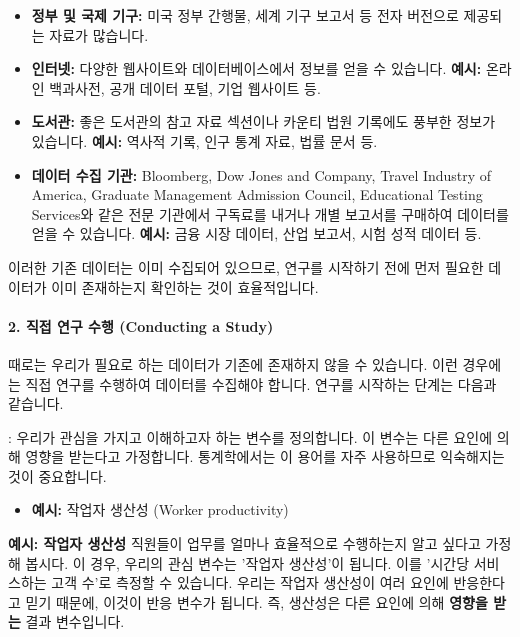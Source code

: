 \documentclass[11pt,a4paper]{article}
\begin{document}
\begin{itemize}
    \item \textbf{정부 및 국제 기구:} 미국 정부 간행물, 세계 기구 보고서 등 전자 버전으로 제공되는 자료가 많습니다.
    \item \textbf{인터넷:} 다양한 웹사이트와 데이터베이스에서 정보를 얻을 수 있습니다.
    \textbf{예시:} 온라인 백과사전, 공개 데이터 포털, 기업 웹사이트 등.
    \item \textbf{도서관:} 좋은 도서관의 참고 자료 섹션이나 카운티 법원 기록에도 풍부한 정보가 있습니다.
    \textbf{예시:} 역사적 기록, 인구 통계 자료, 법률 문서 등.
    \item \textbf{데이터 수집 기관:} Bloomberg, Dow Jones and Company, Travel Industry of America, Graduate Management Admission Council, Educational Testing Services와 같은 전문 기관에서 구독료를 내거나 개별 보고서를 구매하여 데이터를 얻을 수 있습니다.
    \textbf{예시:} 금융 시장 데이터, 산업 보고서, 시험 성적 데이터 등.
\end{itemize}
이러한 기존 데이터는 이미 수집되어 있으므로, 연구를 시작하기 전에 먼저 필요한 데이터가 이미 존재하는지 확인하는 것이 효율적입니다.

\paragraph{2. 직접 연구 수행 (Conducting a Study)}
때로는 우리가 필요로 하는 데이터가 기존에 존재하지 않을 수 있습니다. 이런 경우에는 직접 연구를 수행하여 데이터를 수집해야 합니다. 연구를 시작하는 단계는 다음과 같습니다.

\begin{tcolorbox}[mybox, title={연구 시작의 첫 번째 단계: 반응 변수 정의 (Step One in Initiating a Study)}]
: 우리가 관심을 가지고 이해하고자 하는 변수를 정의합니다. 이 변수는 다른 요인에 의해 영향을 받는다고 가정합니다. 통계학에서는 이 용어를 자주 사용하므로 익숙해지는 것이 중요합니다.
\begin{itemize}
    \item \textbf{예시:} 작업자 생산성 (Worker productivity)
\end{itemize}
\end{tcolorbox}

\begin{examplebox}
\textbf{예시: 작업자 생산성}
직원들이 업무를 얼마나 효율적으로 수행하는지 알고 싶다고 가정해 봅시다. 이 경우, 우리의 관심 변수는 '작업자 생산성'이 됩니다. 이를 '시간당 서비스하는 고객 수'로 측정할 수 있습니다. 우리는 작업자 생산성이 여러 요인에 반응한다고 믿기 때문에, 이것이 반응 변수가 됩니다. 즉, 생산성은 다른 요인에 의해 \textbf{영향을 받는} 결과 변수입니다.
\end{examplebox}
\end{document}
